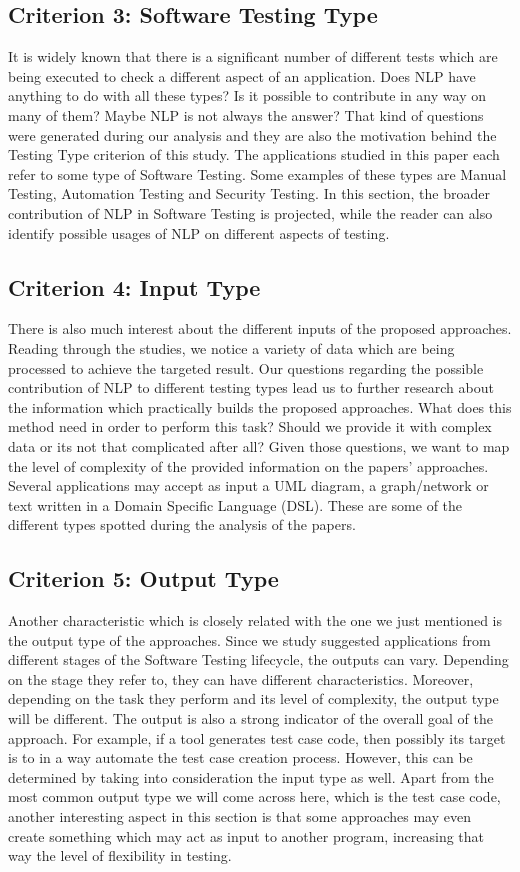 \subsection {Criterion 3: Software Testing Type}
It is widely known that there is a significant number of different tests which are being executed to check a different aspect of an application. Does NLP have anything to do with all these types? Is it possible to 
contribute in any way on many of them? Maybe NLP is not always the answer? That kind of questions were generated during our analysis and they are also the motivation behind the Testing Type criterion of this study. 
The applications studied in this paper each refer to some type of Software Testing. Some examples of these types are Manual Testing, Automation Testing and Security Testing. 
In this section, the broader contribution of NLP in Software Testing is projected, while the reader can also identify possible usages of NLP on different aspects of testing.

\subsection {Criterion 4: Input Type}
There is also much interest about the different inputs of the proposed approaches. Reading through the studies, we notice a variety of data which are 
being processed to achieve the targeted result. Our questions regarding the possible contribution of NLP to different testing types lead us to further research about the information which practically builds 
the proposed approaches. What does this method need in order to perform this task? Should we provide it with complex data or its not that complicated after all? Given those questions, we want to map the level of 
complexity of the provided information on the papers' approaches. Several applications may accept as input a UML 
diagram, a graph/network or text written in a Domain Specific Language (DSL). These are some of the different types spotted during the analysis of the papers.

\subsection {Criterion 5: Output Type}
Another characteristic which is closely related with the one we just mentioned is the output type of the approaches. Since we study suggested applications 
from different stages of the Software Testing lifecycle, the outputs can vary. Depending on the stage they refer to, they can have different characteristics. Moreover, depending on the task they perform and its 
level of complexity, the output type will be different. The output is also a strong indicator of the overall goal of the approach. For example, if a tool generates test case code, then possibly its target is to 
in a way automate the test case creation process. However, this can be determined by taking into consideration the input type as well. Apart from the most common output type we will come across here, which is the 
test case code, another interesting aspect in this section is that some approaches may even create something which may act as input to another program, increasing that way the level of flexibility in testing.

